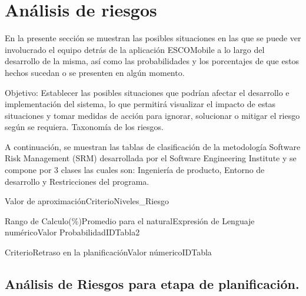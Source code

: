 \section{Análisis de riesgos}

\noindent
En la presente sección se muestran las posibles situaciones en las que se puede ver involucrado el equipo detrás de la 
aplicación ESCOMobile a lo largo del desarrollo de la misma, así como las probabilidades y los porcentajes de que estos hechos
sucedan o se presenten en algún momento.

\noindent
Objetivo: Establecer las posibles situaciones que podrían afectar el desarrollo e
implementación del sistema, lo que permitirá visualizar el impacto de estas situaciones y
tomar medidas de acción para ignorar, solucionar o mitigar el riesgo según se requiera.
Taxonomía de los riesgos.

\noindent
\newline
A continuación, se muestran las tablas de clasificación de la metodología Software Risk
Management (SRM) desarrollada por el Software Engineering Institute y se compone por
3 clases las cuales son: Ingeniería de producto, Entorno de desarrollo y Restricciones del
programa.\cite{Riesgos}

\begin{tablaCC}{Valor de aproximación}{Criterio}{Niveles_Riesgo}
	\caption{Niveles de riesgo.}
\end{tablaCC}

\begin{tablaCCCC}{Rango de Calculo(\%)}{Promedio para el natural}{Expresión de Lenguaje numérico}{Valor Probabilidad}{IDTabla2}
	\caption{Estimación de la probabilidad.}
\end{tablaCCCC}

\begin{tablaCCC}{Criterio}{Retraso en la planificación}{Valor númerico}{IDTabla}

	\caption{Exposición de tiempo.}
\end{tablaCCC}

\subsection{Análisis de Riesgos para etapa de planificación.}


